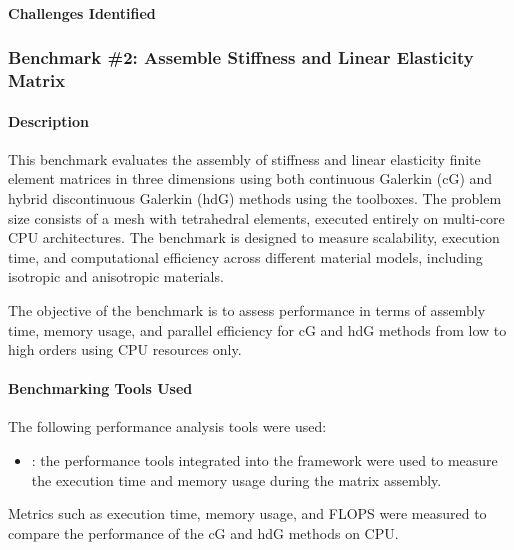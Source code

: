 \paragraph{Challenges Identified}



\subsubsection{Benchmark \#2: Assemble Stiffness and Linear Elasticity Matrix}

\paragraph{Description}
This benchmark evaluates the assembly of stiffness and linear elasticity finite element matrices in three dimensions using both continuous Galerkin (cG) and hybrid discontinuous Galerkin (hdG) methods using the \Feelpp toolboxes.
The problem size consists of a mesh with tetrahedral elements, executed entirely on multi-core CPU architectures.
The benchmark is designed to measure scalability, execution time, and computational efficiency across different material models, including isotropic and anisotropic materials.

The objective of the benchmark is to assess performance in terms of assembly time, memory usage, and parallel efficiency for cG and hdG methods from low to high orders using CPU resources only.

\paragraph{Benchmarking Tools Used}
The following performance analysis tools were used:
\begin{itemize}
    \item \textbf{\Feelpp}: the performance tools integrated into the \Feelpp framework were used to measure the execution time and memory usage during the matrix assembly.
\end{itemize}

Metrics such as execution time, memory usage, and FLOPS were measured to compare the performance of the cG and hdG methods on CPU.

